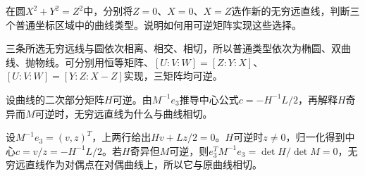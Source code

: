 在圆\(X^2+Y^2=Z^2\)中，分别将\(Z=0\)、\(X=0\)、\(X=Z\)选作新的无穷远直线，判断三个普通坐标区域中的曲线类型。说明如何用可逆矩阵实现这些选择。
\par
\solutionanswer
三条所选无穷远线与圆依次相离、相交、相切，所以普通类型依次为椭圆、双曲线、抛物线。可分别用恒等矩阵、\([U:V:W]=[Z:Y:X]\)、\([U:V:W]=[Y:Z:X-Z]\)实现，三矩阵均可逆。


设曲线的二次部分矩阵\(H\)可逆。由\(M^{-1}e_3\)推导中心公式\(c=-H^{-1}L/2\)，再解释\(H\)奇异而\(M\)可逆时，无穷远直线为什么与曲线相切。
\par
\solutionanswer
设\(M^{-1}e_3=(v,z)^T\)，上两行给出\(Hv+Lz/2=0\)。\(H\)可逆时\(z\ne0\)，归一化得到中心\(c=v/z=-H^{-1}L/2\)。若\(H\)奇异但\(M\)可逆，则\(e_3^TM^{-1}e_3=\det H/\det M=0\)，无穷远直线作为对偶点在对偶曲线上，所以它与原曲线相切。
\par
